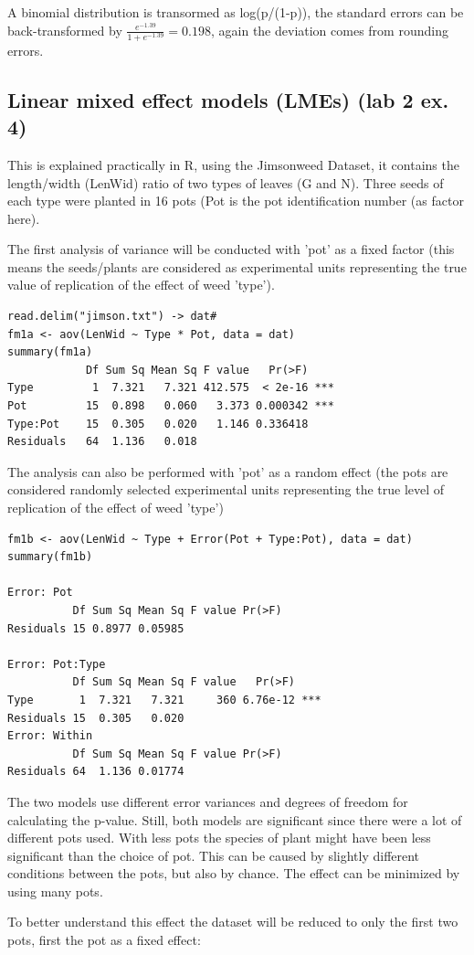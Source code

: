 \documentclass{article}
\begin{document}
A binomial distribution is transormed as log(p/(1-p)), the standard errors can be back-transformed by $\frac{e^{-1.39}}{1+e^{-1.39}} = 0.198$, again the deviation comes from rounding errors. 

\subsection{Linear mixed effect models (LMEs) (lab 2 ex. 4)}
This is explained practically in R, using the Jimsonweed Dataset, it contains the length/width (LenWid) ratio of two types of leaves (G and N). Three seeds of each type were planted in 16 pots (Pot is the pot identification number (as factor here).\par 
The first analysis of variance will be conducted with 'pot' as a fixed factor (this means the seeds/plants are considered as experimental units representing the true value of replication of the effect of weed 'type').

\begin{lstlisting}
read.delim("jimson.txt") -> dat#
fm1a <- aov(LenWid ~ Type * Pot, data = dat)
summary(fm1a)
            Df Sum Sq Mean Sq F value   Pr(>F)    
Type         1  7.321   7.321 412.575  < 2e-16 ***
Pot         15  0.898   0.060   3.373 0.000342 ***
Type:Pot    15  0.305   0.020   1.146 0.336418    
Residuals   64  1.136   0.018 
\end{lstlisting}

The analysis can also be performed with 'pot' as a random effect (the pots are considered randomly selected experimental units representing the true level of replication of the effect of weed 'type')

\begin{lstlisting}
fm1b <- aov(LenWid ~ Type + Error(Pot + Type:Pot), data = dat)
summary(fm1b)

Error: Pot
          Df Sum Sq Mean Sq F value Pr(>F)
Residuals 15 0.8977 0.05985               

Error: Pot:Type
          Df Sum Sq Mean Sq F value   Pr(>F)    
Type       1  7.321   7.321     360 6.76e-12 ***
Residuals 15  0.305   0.020                     
Error: Within
          Df Sum Sq Mean Sq F value Pr(>F)
Residuals 64  1.136 0.01774      
\end{lstlisting}

The two models use different error variances and degrees of freedom for calculating the p-value. Still, both models are significant since there were a lot of different pots used. With less pots the species of plant might have been less significant than the choice of pot. This can be caused by slightly different conditions between the pots, but also by chance. The effect can be minimized by using many pots.\par 
To better understand this effect the dataset will be reduced to only the first two pots, first the pot as a fixed effect:
\end{document}
